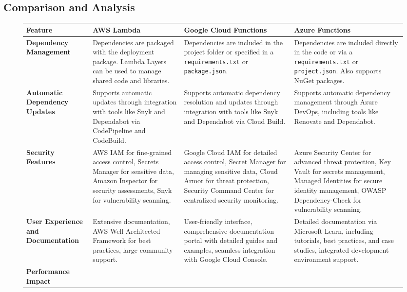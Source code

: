 \documentclass[sigconf]{acmart}
\begin{document}
\subsection{Comparison and Analysis}

\begin{figure*}[ht]
	\centering
	\begin{tabular}{|p{4cm}|p{4cm}|p{4cm}|p{4cm}|}
	\hline
	\textbf{Feature} & \textbf{AWS Lambda} & \textbf{Google Cloud Functions} & \textbf{Azure Functions} \\
	\hline
	\textbf{Dependency Management} & 
	Dependencies are packaged with the deployment package. Lambda Layers can be used to manage shared code and libraries. & 
	Dependencies are included in the project folder or specified in a \texttt{requirements.txt} or \texttt{package.json}. & 
	Dependencies are included directly in the code or via a \texttt{requirements.txt} or \texttt{project.json}. Also supports NuGet packages. \\
	\hline
	\textbf{Automatic Dependency Updates} & 
	Supports automatic updates through integration with tools like Snyk and Dependabot via CodePipeline and CodeBuild. & 
	Supports automatic dependency resolution and updates through integration with tools like Snyk and Dependabot via Cloud Build. & 
	Supports automatic dependency management through Azure DevOps, including tools like Renovate and Dependabot. \\
	\hline
	\textbf{Security Features} & 
	AWS IAM for fine-grained access control, Secrets Manager for sensitive data, Amazon Inspector for security assessments, Snyk for vulnerability scanning. & 
	Google Cloud IAM for detailed access control, Secret Manager for managing sensitive data, Cloud Armor for threat protection, Security Command Center for centralized security monitoring. & 
	Azure Security Center for advanced threat protection, Key Vault for secrets management, Managed Identities for secure identity management, OWASP Dependency-Check for vulnerability scanning. \\
	\hline
	\textbf{User Experience and Documentation} & 
	Extensive documentation, AWS Well-Architected Framework for best practices, large community support. & 
	User-friendly interface, comprehensive documentation portal with detailed guides and examples, seamless integration with Google Cloud Console. & 
	Detailed documentation via Microsoft Learn, including tutorials, best practices, and case studies, integrated development environment support. \\
	\hline
	\textbf{Performance Impact} & 

\end{tabular}
\end{figure*}
\end{document}
